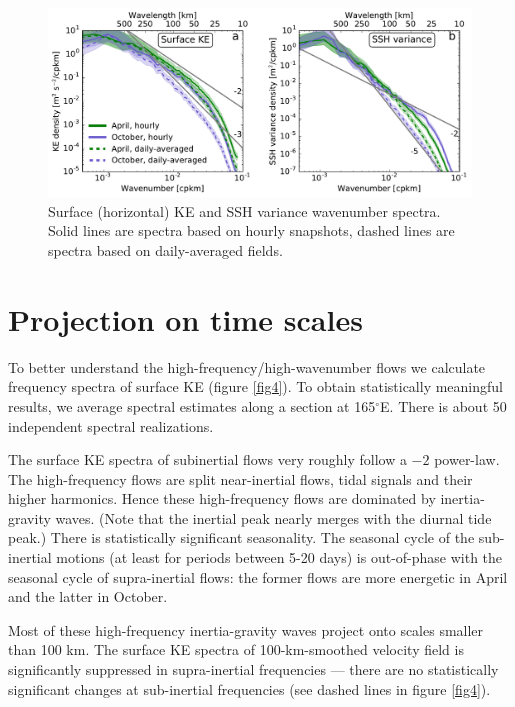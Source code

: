\documentclass[grl]{agutex2015}
\begin{document}
\begin{article}
\begin{figure}[ht]
  \begin{center}
    \includegraphics[width=.9\textwidth]{figs/fig3.pdf}
 \caption{Surface (horizontal) KE and SSH variance wavenumber spectra. Solid lines
 are spectra based on hourly snapshots, dashed lines are spectra based on daily-averaged
 fields.}
 \label{fig3}
 \end{center}
\end{figure}

\section{Projection on time scales}
To better understand the high-frequency/high-wavenumber flows  we calculate frequency
spectra of surface KE (figure \ref{fig4}). To obtain statistically meaningful results,
we average spectral estimates along a section at 165$^\circ$E.  There is about 50
independent spectral realizations.

The surface KE spectra of subinertial flows very roughly follow a $-2$ power-law.
The high-frequency flows are split near-inertial flows, tidal signals and their
higher harmonics. Hence these high-frequency flows are dominated by inertia-gravity
waves. (Note that the inertial peak nearly merges with the
diurnal tide peak.) There is statistically significant seasonality. The seasonal
cycle of the sub-inertial motions (at least for periods between 5-20 days)
is out-of-phase with the seasonal cycle of supra-inertial flows: the former flows
are more energetic in April and the latter in October.

Most of these high-frequency inertia-gravity waves project onto scales smaller
than 100 km. The surface KE spectra of 100-km-smoothed velocity field is significantly
suppressed in supra-inertial frequencies --- there are no statistically significant
changes at sub-inertial frequencies (see dashed lines in figure \ref{fig4}).



\end{article}
\end{document}
